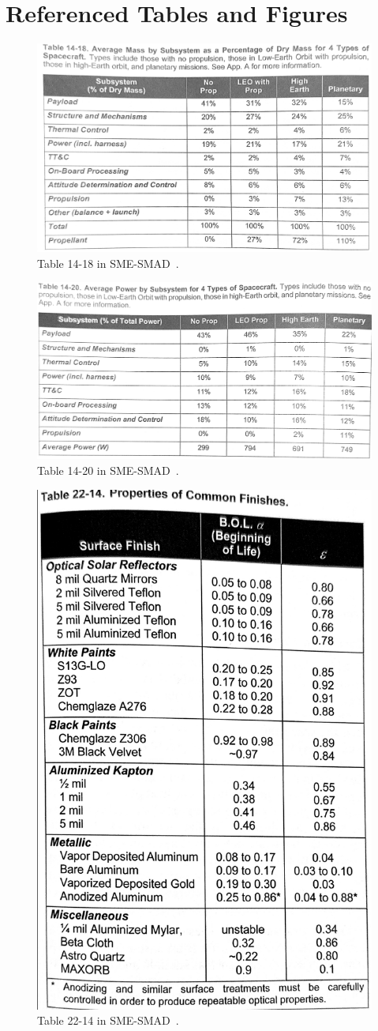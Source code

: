 \documentclass[9pt]{article}
\begin{document}
\section{Referenced Tables and Figures}\label{app:refs}
\begin{figure}[h]
  \centering
  \includegraphics[width=.8\textwidth]{1418}
  \caption{Table 14-18 in SME-SMAD~\cite[p. 422]{sme}.}
  \label{fig:1418}
\end{figure}
\begin{figure}[h]
  \centering
  \includegraphics[width=.8\textwidth]{1420}
  \caption{Table 14-20 in SME-SMAD~\cite[p. 424]{sme}.}
  \label{fig:1420}
\end{figure}
\begin{figure}[h]
  \centering
  \includegraphics[width=.4\textwidth]{2214}
  \caption{Table 22-14 in SME-SMAD~\cite[p. 695]{sme}.}
  \label{fig:2214}
\end{figure}
\end{document}
